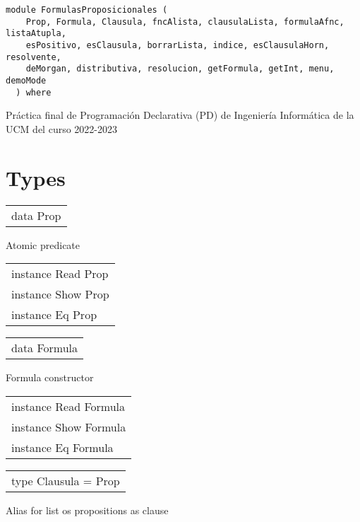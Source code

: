 \label{module:FormulasProposicionales}
\haddockbeginheader
{\haddockverb\begin{verbatim}
module FormulasProposicionales (
    Prop, Formula, Clausula, fncAlista, clausulaLista, formulaAfnc, listaAtupla,
    esPositivo, esClausula, borrarLista, indice, esClausulaHorn, resolvente,
    deMorgan, distributiva, resolucion, getFormula, getInt, menu, demoMode
  ) where\end{verbatim}}
\haddockendheader

Práctica final de Programación Declarativa (PD) de Ingeniería Informática de la UCM del curso 2022-2023\par
\section{Types}
\begin{haddockdesc}
\item[\begin{tabular}{@{}l}
data Prop
\end{tabular}]
{\haddockbegindoc
Atomic predicate\par}
\end{haddockdesc}
\begin{haddockdesc}
\item[\begin{tabular}{@{}l}
instance Read Prop\\instance Show Prop\\instance Eq Prop
\end{tabular}]
\end{haddockdesc}
\begin{haddockdesc}
\item[\begin{tabular}{@{}l}
data Formula
\end{tabular}]
{\haddockbegindoc
Formula constructor\par}
\end{haddockdesc}
\begin{haddockdesc}
\item[\begin{tabular}{@{}l}
instance Read Formula\\instance Show Formula\\instance Eq Formula
\end{tabular}]
\end{haddockdesc}
\begin{haddockdesc}
\item[\begin{tabular}{@{}l}
type Clausula = {\char 91}Prop{\char 93}
\end{tabular}]
{\haddockbegindoc
Alias for list os propositions as clause\par}
\end{haddockdesc}
